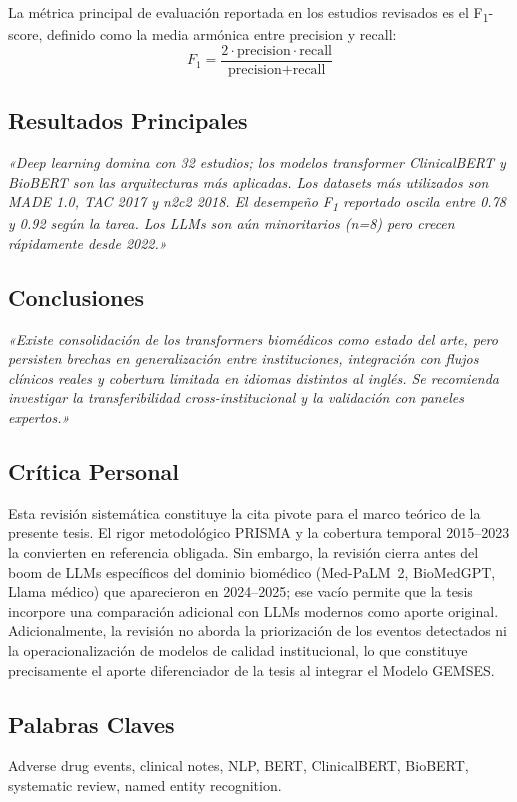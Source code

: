 \documentclass[11pt,a4paper]{article}
\newcommand{\cita}[1]{{\color{navy}\textit{«#1»}}}
\begin{document}
La métrica principal de evaluación reportada en los estudios revisados es el F\textsubscript{1}-score, definido como la media armónica entre precision y recall:
\begin{equation}
F_{1} = \frac{2 \cdot \text{precision} \cdot \text{recall}}{\text{precision} + \text{recall}}
\end{equation}

\subsection{Resultados Principales}
\cita{Deep learning domina con 32 estudios; los modelos transformer ClinicalBERT y BioBERT son las arquitecturas más aplicadas. Los datasets más utilizados son MADE 1.0, TAC 2017 y n2c2 2018. El desempeño F\textsubscript{1} reportado oscila entre 0.78 y 0.92 según la tarea. Los LLMs son aún minoritarios (n=8) pero crecen rápidamente desde 2022.}

\subsection{Conclusiones}
\cita{Existe consolidación de los transformers biomédicos como estado del arte, pero persisten brechas en generalización entre instituciones, integración con flujos clínicos reales y cobertura limitada en idiomas distintos al inglés. Se recomienda investigar la transferibilidad cross-institucional y la validación con paneles expertos.}

\subsection{Crítica Personal}
Esta revisión sistemática constituye la cita pivote para el marco teórico de la presente tesis. El rigor metodológico PRISMA y la cobertura temporal 2015--2023 la convierten en referencia obligada. Sin embargo, la revisión cierra antes del boom de LLMs específicos del dominio biomédico (Med-PaLM~2, BioMedGPT, Llama médico) que aparecieron en 2024--2025; ese vacío permite que la tesis incorpore una comparación adicional con LLMs modernos como aporte original. Adicionalmente, la revisión no aborda la priorización de los eventos detectados ni la operacionalización de modelos de calidad institucional, lo que constituye precisamente el aporte diferenciador de la tesis al integrar el Modelo GEMSES.

\subsection{Palabras Claves}
Adverse drug events, clinical notes, NLP, BERT, ClinicalBERT, BioBERT, systematic review, named entity recognition.
\end{document}
